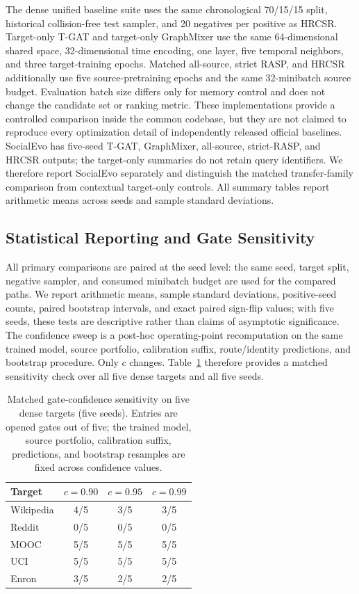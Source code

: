 \documentclass[journal]{IEEEtran}
\begin{document}
The dense unified baseline suite uses the same chronological 70/15/15 split, historical collision-free test sampler, and 20 negatives per positive as HRCSR. Target-only T-GAT and target-only GraphMixer use the same 64-dimensional shared space, 32-dimensional time encoding, one layer, five temporal neighbors, and three target-training epochs. Matched all-source, strict RASP, and HRCSR additionally use five source-pretraining epochs and the same 32-minibatch source budget. Evaluation batch size differs only for memory control and does not change the candidate set or ranking metric. These implementations provide a controlled comparison inside the common codebase, but they are not claimed to reproduce every optimization detail of independently released official baselines. SocialEvo has five-seed T-GAT, GraphMixer, all-source, strict-RASP, and HRCSR outputs; the target-only summaries do not retain query identifiers. We therefore report SocialEvo separately and distinguish the matched transfer-family comparison from contextual target-only controls. All summary tables report arithmetic means across seeds and sample standard deviations.

\subsection{Statistical Reporting and Gate Sensitivity}
All primary comparisons are paired at the seed level: the same seed, target split, negative sampler, and consumed minibatch budget are used for the compared paths. We report arithmetic means, sample standard deviations, positive-seed counts, paired bootstrap intervals, and exact paired sign-flip values; with five seeds, these tests are descriptive rather than claims of asymptotic significance. The confidence sweep is a post-hoc operating-point recomputation on the same trained model, source portfolio, calibration suffix, route/identity predictions, and bootstrap procedure. Only $c$ changes. Table~\ref{tab:gate_sensitivity} therefore provides a matched sensitivity check over all five dense targets and all five seeds.

\begin{table}[t]
\centering
\caption{Matched gate-confidence sensitivity on five dense targets (five seeds). Entries are opened gates out of five; the trained model, source portfolio, calibration suffix, predictions, and bootstrap resamples are fixed across confidence values.}
\label{tab:gate_sensitivity}
\small
\begin{tabular}{lccc}
\toprule
\textbf{Target} & $c=0.90$ & $c=0.95$ & $c=0.99$ \\
\midrule
Wikipedia & 4/5 & 3/5 & 3/5 \\
Reddit    & 0/5 & 0/5 & 0/5 \\
MOOC      & 5/5 & 5/5 & 5/5 \\
UCI       & 5/5 & 5/5 & 5/5 \\
Enron     & 3/5 & 2/5 & 2/5 \\
\bottomrule
\end{tabular}
\end{table}
\end{document}
